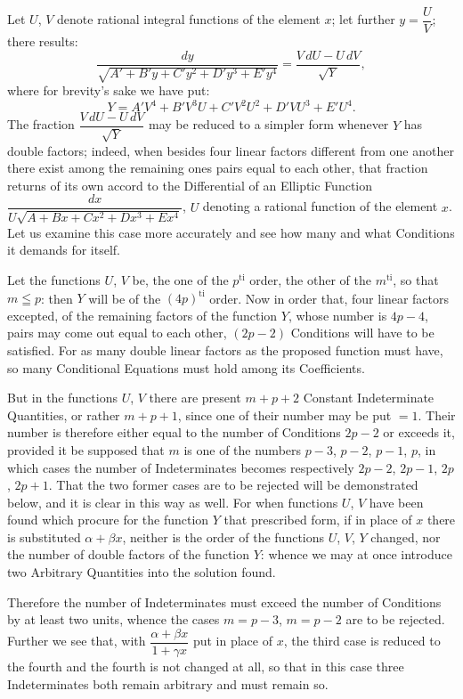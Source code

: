\documentclass{article}
\begin{document}
Let $U$, $V$ denote rational integral functions of the element $x$; let further $y=\dfrac{U}{V}$; there results:
\[
\frac{dy}{\sqrt{A'+B'y+C'y^{2}+D'y^{3}+E'y^{4}}}=\frac{V\,dU-U\,dV}{\sqrt{Y}},
\]
where for brevity's sake we have put:
\[
Y=A'V^{4}+B'V^{3}U+C'V^{2}U^{2}+D'VU^{3}+E'U^{4}.
\]
The fraction $\dfrac{V\,dU-U\,dV}{\sqrt{Y}}$ may be reduced to a simpler form whenever $Y$ has double factors; indeed, when besides four linear factors different from one another there exist among the remaining ones pairs equal to each other, that fraction returns of its own accord to the Differential of an Elliptic Function $\dfrac{dx}{U\sqrt{A+Bx+Cx^{2}+Dx^{3}+Ex^{4}}}$, $U$ denoting a rational function of the element $x$. Let us examine this case more accurately and see how many and what Conditions it demands for itself.

Let the functions $U$, $V$ be, the one of the $p^{\mathrm{ti}}$ order, the other of the $m^{\mathrm{ti}}$, so that $m\leqq p$: then $Y$ will be of the $(4p)^{\mathrm{ti}}$ order. Now in order that, four linear factors excepted, of the remaining factors of the function $Y$, whose number is $4p-4$, pairs may come out equal to each other, $(2p-2)$ Conditions will have to be satisfied. For as many double linear factors as the proposed function must have, so many Conditional Equations must hold among its Coefficients.

But in the functions $U$, $V$ there are present $m+p+2$ Constant Indeterminate Quantities, or rather $m+p+1$, since one of their number may be put $=1$. Their number is therefore either equal to the number of Conditions $2p-2$ or exceeds it, provided it be supposed that $m$ is one of the numbers $p-3$, $p-2$, $p-1$, $p$, in which cases the number of Indeterminates becomes respectively $2p-2$, $2p-1$, $2p$, $2p+1$. That the two former cases are to be rejected will be demonstrated below, and it is clear in this way as well. For when functions $U$, $V$ have been found which procure for the function $Y$ that prescribed form, if in place of $x$ there is substituted $\alpha+\beta x$, neither is the order of the functions $U$, $V$, $Y$ changed, nor the number of double factors of the function $Y$: whence we may at once introduce two Arbitrary Quantities into the solution found.

Therefore the number of Indeterminates must exceed the number of Conditions by at least two units, whence the cases $m=p-3$, $m=p-2$ are to be rejected. Further we see that, with $\dfrac{\alpha+\beta x}{1+\gamma x}$ put in place of $x$, the third case is reduced to the fourth and the fourth is not changed at all, so that in this case three Indeterminates both remain arbitrary and must remain so.
\end{document}
